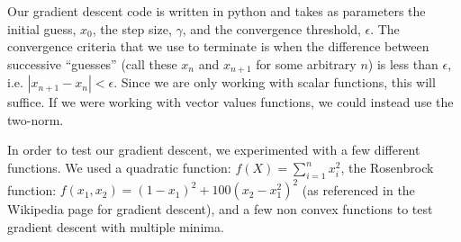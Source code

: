 \documentclass{article}
\begin{document}
\begin{table}[ht]
\caption{Finite difference method numerical gradient v. analytical gradient for various point of the quadratic bowl function and a non-convex function for $h=0.5$.}
\label{TableFinDiff}
\begin{center}
\begin{small}
\begin{sc}
\end{sc}
\end{small}
\end{center}
\vskip -0.1in
\end{table}


Our gradient descent code is written in python and takes as parameters the initial guess, $x_0$, the step size, $\gamma$, and the convergence threshold, $\epsilon$.  The convergence criteria that we use to terminate is when the difference between successive ``guesses'' (call these $x_n$ and $x_{n+1}$ for some arbitrary $n$) is less than $\epsilon$, i.e. $|x_{n+1} -x_n | < \epsilon$.  Since we are only working with scalar functions, this will suffice.  If we were working with vector values functions, we could instead use the two-norm.  

In order to test our gradient descent, we experimented with a few different functions.  We used a quadratic function: $f(X) = \sum_{i=1}^n x_i^2$, the Rosenbrock function: $f(x_1,x_2) = (1-x_1)^2+100(x_2-x_1^2)^2$ (as referenced in the Wikipedia page for gradient descent), and a few non convex functions to test gradient descent with multiple minima.  
\end{document}

